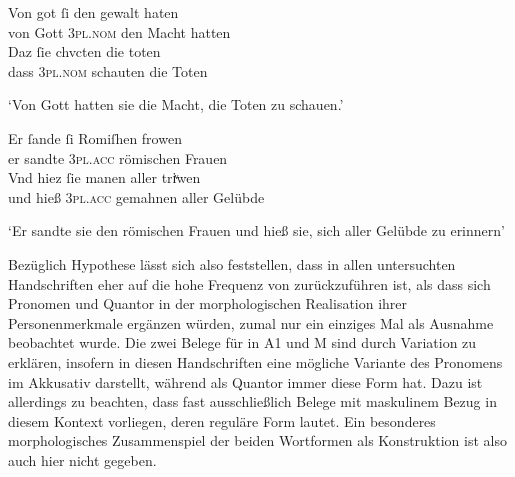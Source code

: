 \begin{exe}
\ex \label{ex:vbsisie}
 	\begin{xlist}
 	\ex \gll Von got ſi den gewalt haten \\
		     von Gott \textsc{3pl\subM.nom} den Macht hatten \\
 	\sn \gll Daz ſie chvcten die toten \\
		     dass \textsc{3pl\subM.nom} schauten die Toten \\
		\begin{taggedline}{\parencites[\pno~42ra,38--39]{kc:VB}[vgl.][8664--8665]{schroeder1895}}
		\trans `Von Gott hatten sie  die Macht, die
			Toten zu schauen.'
		\end{taggedline}
 		\label{ex:vbsisie_1}

	\ex \gll Er ſande ſi Romiſhen frowen \\
		     er sandte \textsc{3pl\subI.acc} römischen Frauen \\
	\sn \gll Vnd hiez ſie manen aller triͮwen \\
		     und hieß \textsc{3pl\subF.acc} gemahnen aller Gelübde \\
		\begin{taggedline}{\parencites[\pno~50va,5--6]{kc:VB}[vgl.][10467--10468]{schroeder1895}}
		\trans `Er sandte sie  den römischen Frauen und
			hieß sie, sich aller Gelübde zu erinnern'
		\end{taggedline}
		\label{ex:vbsisie_2}
	\end{xlist}
\end{exe}

Bezüglich  Hypothese lässt sich also feststellen, dass
 in allen unter\-suchten Handschriften eher auf die hohe Frequenz
von  zurückzuführen ist, als dass sich Pro\-nomen und Quantor in der
morphologischen Realisation ihrer Personenmerkmale ergänzen würden, zumal
 nur ein einziges Mal als Ausnahme beobachtet wurde. Die zwei
Belege für  in A1 und M sind durch
Variation zu erklären, insofern  in diesen Handschriften eine
mög\-liche Variante des Pronomens im Akkusativ darstellt, während 
als Quantor immer diese Form hat. Dazu ist allerdings zu beachten, dass fast
ausschließlich Belege mit maskulinem Bezug in diesem Kontext vorliegen, deren
reguläre Form  lautet. Ein besonderes morphologisches Zusammenspiel
der beiden Wortformen als Konstruktion ist also auch hier nicht gegeben.

